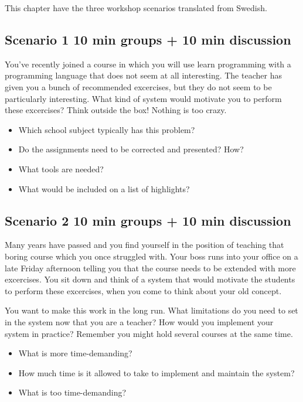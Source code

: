 This chapter have the three workshop scenarios translated from Swedish.

\subsection*{Scenario 1 10 min groups + 10 min discussion}
You've recently joined a course in which you will use learn programming with a programming language that does not seem at all interesting. The teacher has given you a bunch of recommended excercises, but they do not seem to be particularly interesting. What kind of system would motivate you to perform these excercises? Think outside the box! Nothing is too crazy.

\begin{itemize}
\item Which school subject typically has this problem?
\item Do the assignments need to be corrected and presented? How?
\item What tools are needed?
\item What would be included on a list of highlights?
\end{itemize}

\subsection*{Scenario 2 10 min groups + 10 min discussion}
Many years have passed and you find yourself in the position of teaching that boring course which you once struggled with. Your boss runs into your office on a late Friday afternoon telling you that the course needs to be extended with more excercises. You sit down and think of a system that would motivate the students to perform these excercises, when you come to think about your old concept.

You want to make this work in the long run. What limitations do you need to set in the system now that you are a teacher? How would you implement your system in practice? Remember you might hold several courses at the same time.

\begin{itemize}
\item What is more time-demanding?
\item How much time is it allowed to take to implement and maintain the system?
\item What is too time-demanding?
\end{itemize}

